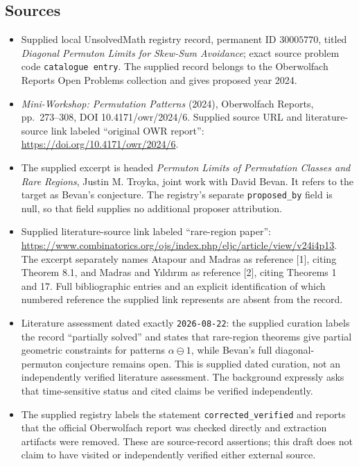 \documentclass[11pt]{article}
\begin{document}
\subsection{Sources}
\begin{itemize}
\item Supplied local UnsolvedMath registry record, permanent ID \(30005770\), titled \emph{Diagonal Permuton Limits for Skew-Sum Avoidance}; exact source problem code \texttt{catalogue entry}. The supplied record belongs to the Oberwolfach Reports Open Problems collection and gives proposed year 2024.
\item \emph{Mini-Workshop: Permutation Patterns} (2024), Oberwolfach Reports, pp.\ 273--308, DOI 10.4171/owr/2024/6. Supplied source URL and literature-source link labeled ``original OWR report'': \url{https://doi.org/10.4171/owr/2024/6}.
\item The supplied excerpt is headed \emph{Permuton Limits of Permutation Classes and Rare Regions}, Justin M. Troyka, joint work with David Bevan. It refers to the target as Bevan's conjecture. The registry's separate \texttt{proposed\_by} field is null, so that field supplies no additional proposer attribution.
\item Supplied literature-source link labeled ``rare-region paper'': \url{https://www.combinatorics.org/ojs/index.php/eljc/article/view/v24i4p13}. The excerpt separately names Atapour and Madras as reference [1], citing Theorem 8.1, and Madras and Yıldırım as reference [2], citing Theorems 1 and 17. Full bibliographic entries and an explicit identification of which numbered reference the supplied link represents are absent from the record.
\item Literature assessment dated exactly \texttt{2026-08-22}: the supplied curation labels the record ``partially solved'' and states that rare-region theorems give partial geometric constraints for patterns \(\alpha\ominus1\), while Bevan's full diagonal-permuton conjecture remains open. This is supplied dated curation, not an independently verified literature assessment. The background expressly asks that time-sensitive status and cited claims be verified independently.
\item The supplied registry labels the statement \texttt{corrected\_verified} and reports that the official Oberwolfach report was checked directly and extraction artifacts were removed. These are source-record assertions; this draft does not claim to have visited or independently verified either external source.
\end{itemize}
\end{document}
